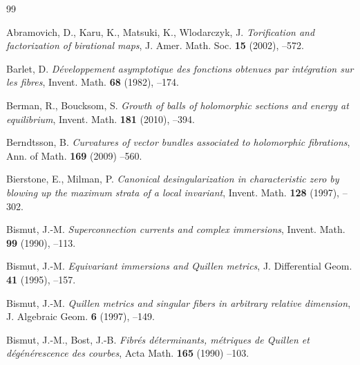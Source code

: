 \documentclass[amscd, leqno]{amsart}
\theoremstyle{plain}
\theoremstyle{definition}
\theoremstyle{remark}
\begin{document}
\begin{thebibliography}{99}


Abramovich, D., Karu, K., Matsuki, K., Wlodarczyk, J.
\newblock 
\textit{Torification and factorization of birational maps},
\newblock 
J. Amer. Math. Soc. 
\newblock 
{\bf 15}
\newblock 
(2002),
--572.


Barlet, D.
\newblock 
\textit{D\'eveloppement asymptotique des fonctions obtenues par int\'egration sur les fibres},
\newblock 
Invent. Math. 
\newblock 
{\bf 68}
\newblock 
(1982),
--174.


Berman, R., Boucksom, S.
\textit{Growth of balls of holomorphic sections and energy at equilibrium},
\newblock 
Invent. Math. 
\newblock 
{\bf 181}
\newblock 
(2010),
--394.


Berndtsson, B.
\newblock
\textit{Curvatures of vector bundles associated to holomorphic fibrations},
\newblock
Ann. of Math.
\newblock
{\bf 169}
\newblock
(2009)
--560.


Bierstone, E., Milman, P.
\newblock
\textit{Canonical desingularization in characteristic zero by blowing up the maximum strata of a local invariant},
\newblock 
Invent. Math.
\newblock 
{\bf 128}
\newblock 
(1997),
--302.


Bismut, J.-M.
\newblock 
\textit{Superconnection currents and complex immersions},
\newblock 
Invent. Math.
\newblock 
{\bf 99}
\newblock 
(1990),
--113.


Bismut, J.-M.
\newblock 
\textit{Equivariant immersions and Quillen metrics},
\newblock 
J. Differential Geom.
\newblock 
{\bf 41}
\newblock 
(1995),
--157.


Bismut, J.-M.
\newblock 
\textit{Quillen metrics and singular fibers in arbitrary relative dimension},
\newblock 
J. Algebraic Geom.
\newblock 
{\bf 6}
\newblock 
(1997),
--149.


Bismut, J.-M., Bost, J.-B.
\newblock
\textit{Fibr\'es d\'eterminants, m\'etriques de Quillen et d\'eg\'en\'erescence des courbes},
\newblock 
Acta Math.
\newblock 
{\bf 165}
\newblock 
(1990)
--103.



\end{thebibliography}
\end{document}
